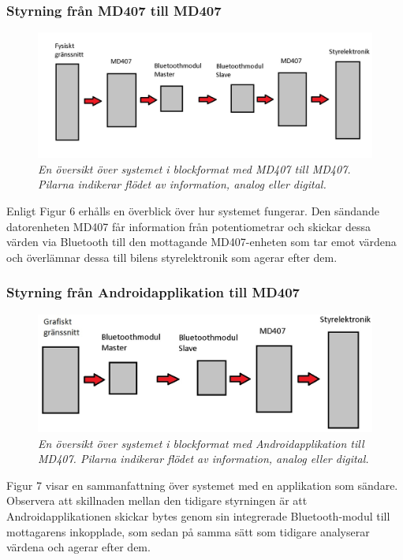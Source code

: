 \documentclass[a4paper]{article}
\begin{document}
\subsubsection{Styrning från MD407 till MD407}
\begin{figure}[H]
\includegraphics[width=\textwidth]{systemoversikt.jpg}
\centering
\caption{\it En översikt över systemet i blockformat med MD407 till MD407. Pilarna indikerar flödet av information, analog eller digital.}
\end{figure} 


Enligt Figur 6 erhålls en överblick över hur systemet fungerar. Den sändande datorenheten MD407 får information från potentiometrar och skickar dessa värden via Bluetooth till den mottagande MD407-enheten som tar emot värdena och överlämnar dessa till bilens styrelektronik som agerar efter dem.

\subsubsection{Styrning från Androidapplikation till MD407}
\begin{figure}[H]
\includegraphics[width=\textwidth]{systemoversiktAndroid.jpg}
\centering
\caption{\it En översikt över systemet i blockformat med Androidapplikation till MD407. Pilarna indikerar flödet av information, analog eller digital.}
\end{figure} 

Figur 7 visar en sammanfattning över systemet med en applikation som sändare. Observera att skillnaden mellan den tidigare styrningen är att Androidapplikationen skickar bytes genom sin integrerade Bluetooth-modul till mottagarens inkopplade, som sedan på samma sätt som tidigare analyserar värdena och agerar efter dem.
\end{document}

